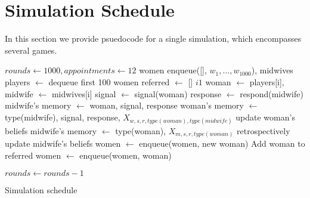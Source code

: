 
\section{Simulation Schedule}
\label{app:sim_schedule}

In this section we provide psuedocode for a single simulation, which encompasses several games.

\begin{algorithm}
\begin{algorithmic}
\State $rounds \gets 1000, appointments \gets 12$
\State women \gets enqueue([], $w_{1},\ldots,w_{1000}$), midwives \gets [$m_{1},\ldots,m_{100}$]
	\State players $\gets$ dequeue first 100 women
	\State referred $\gets$ []
	\State $i $\gets$ 1$
		\State woman $\gets$ players[i], midwife $\gets$ midwives[i]
		\State signal $\gets$ signal(woman)
		\State response $\gets$ respond(midwife)
		\State midwife's memory $\gets$ woman, signal, response
		\State woman's memory $\gets$ type(midwife), signal, response, $X_{w, s, r, type(woman), type(midwife)}$
		\State update woman's beliefs
			\State midwife's memory $\gets$ type(woman), $X_{m, s, r, type(woman)}$
			\State retrospectively update midwife's beliefs
			\State women $\gets$ enqueue(women, new woman)
			\State Add woman to referred
		\Else
			women $\gets$ enqueue(women, woman)
		\EndIf
	\EndWhile

			\EndFor
		\EndIf
	\EndFor
\State $rounds \gets rounds - 1$
\EndWhile
\end{algorithmic}
\caption{Simulation schedule\label{alg:sim}}
\end{algorithm}
